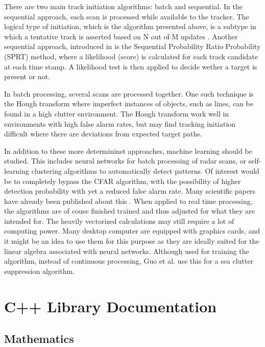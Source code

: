 \documentclass[letterpaper]{book}
\begin{document}
There are two main track initiation algorithms: batch and sequential. In the sequential approach, each scan is processed while available to the tracker. The logical type of initiation, which is the algorithm presented above, is a subtype in which a tentative track is asserted based on N out of M updates \cite{ref:bar-shalom_et_al, ref:xi_et_al}. Another sequential approach, introduced in \cite{ref:hough} is the Sequential Probability Ratio Probability (SPRT) method, where a likelihood (score) is calculated for each track candidate at each time stamp. A likelihood test is then applied to decide wether a target is present or not. 

In batch processing, several scans are processed together. One such technique is the Hough transform \cite{ref:hough} where imperfect instances of objects, such as lines, can be found in a high clutter environment. The Hough transform work well in environments with high false alarm rates, but may find tracking initiation difficult where there are deviations from expected target paths.

In addition to these more determininst approaches, machine learning should be studied. This includes neural networks for batch processing of radar scans, or self-learning clustering algorithms to automatically detect patterns. Of interest would be to completely bypass the CFAR algorithm, with the possibility of higher detection probability with yet a reduced false alarm rate. Many scientific papers have already been published about this \cite{ref:justin_et_al}. When applied to real time processing, the algorithms are of couse finished trained and thus adjusted for what they are intended for. The heavily vectorized calculations may still require a lot of computing power. Many desktop computer are equipped with graphics cards, and it might be an idea to use them for this purpose as they are ideally suited for the linear algebra associated with neural networks. Although used for training the algorithm, instead of continuous processing, Guo et al. \cite{ref:guo_et_al} use this for a sea clutter suppression algorithm. 




\chapter{C++ Library Documentation}
\section{Mathematics}
\end{document}
